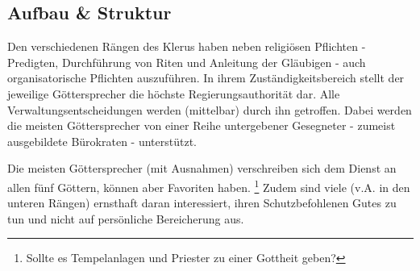 \subsection{Aufbau \& Struktur}
Den verschiedenen Rängen des Klerus haben neben religiösen Pflichten - Predigten, Durchführung von Riten und Anleitung der Gläubigen - auch organisatorische Pflichten auszuführen. 
In ihrem Zuständigkeitsbereich stellt der jeweilige Göttersprecher die höchste Regierungsauthorität dar. 
Alle Verwaltungsentscheidungen werden (mittelbar) durch ihn getroffen.
Dabei werden die meisten Göttersprecher von einer Reihe untergebener Gesegneter - zumeist ausgebildete Bürokraten - unterstützt.

Die meisten Göttersprecher (mit Ausnahmen) verschreiben sich dem Dienst an allen fünf Göttern, können aber Favoriten haben. 
\footnote{Sollte es Tempelanlagen und Priester zu einer Gottheit geben?}
Zudem sind viele (v.A. in den unteren Rängen) ernsthaft daran interessiert, ihren Schutzbefohlenen Gutes zu tun und nicht auf persönliche Bereicherung aus.

